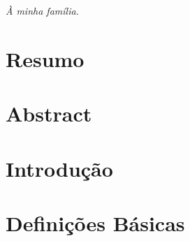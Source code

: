 \documentclass[a4paper,12pt]{report}
\begin{document}
	
	
	\newpage
	
	\thispagestyle{empty}
	\vfill
	\begin{center}
		\textit{À minha família.}
	\end{center}
	\vfill
	
	\newpage
	
	\chapter*{}
	
	
	
	\thispagestyle{empty}
	\newpage
	
	
	\chapter*{\centering Resumo}
	
	
	
	
	\thispagestyle{empty} 
	
	\newpage
	
	\chapter*{\centering Abstract}
	
	
	
	
	\thispagestyle{empty} 
	\newpage
	
	
	\begin{titlepage}
		\tableofcontents
		\thispagestyle{empty}
	\end{titlepage}
	
	\newpage
	
	
	\chapter*{Introdução}
	
	
	\newpage
	
	
	\chapter{Definições Básicas}
\end{document}

